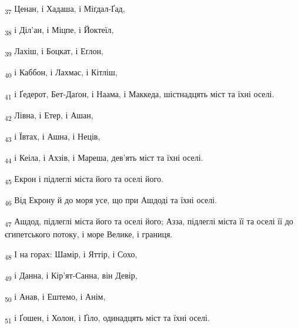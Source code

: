 \begin{tcolorbox}
\textsubscript{37} Ценан, і Хадаша, і Міґдал-Ґад,
\end{tcolorbox}
\begin{tcolorbox}
\textsubscript{38} і Діл'ан, і Міцпе, і Йоктеїл,
\end{tcolorbox}
\begin{tcolorbox}
\textsubscript{39} Лахіш, і Боцкат, і Еґлон,
\end{tcolorbox}
\begin{tcolorbox}
\textsubscript{40} і Каббон, і Лахмас, і Кітліш,
\end{tcolorbox}
\begin{tcolorbox}
\textsubscript{41} і Ґедерот, Бет-Даґон, і Наама, і Маккеда, шістнадцять міст та їхні оселі.
\end{tcolorbox}
\begin{tcolorbox}
\textsubscript{42} Лівна, і Етер, і Ашан,
\end{tcolorbox}
\begin{tcolorbox}
\textsubscript{43} і Ївтах, і Ашна, і Неців,
\end{tcolorbox}
\begin{tcolorbox}
\textsubscript{44} і Кеіла, і Ахзів, і Мареша, дев'ять міст та їхні оселі.
\end{tcolorbox}
\begin{tcolorbox}
\textsubscript{45} Екрон і підлеглі міста його та оселі його.
\end{tcolorbox}
\begin{tcolorbox}
\textsubscript{46} Від Екрону й до моря усе, що при Ашдоді та їхні оселі.
\end{tcolorbox}
\begin{tcolorbox}
\textsubscript{47} Ашдод, підлеглі міста його та оселі його; Азза, підлеглі міста її та оселі її до єгипетського потоку, і море Велике, і границя.
\end{tcolorbox}
\begin{tcolorbox}
\textsubscript{48} І на горах: Шамір, і Яттір, і Сохо,
\end{tcolorbox}
\begin{tcolorbox}
\textsubscript{49} і Данна, і Кір'ят-Санна, він Девір,
\end{tcolorbox}
\begin{tcolorbox}
\textsubscript{50} і Анав, і Ештемо, і Анім,
\end{tcolorbox}
\begin{tcolorbox}
\textsubscript{51} і Ґошен, і Холон, і Ґіло, одинадцять міст та їхні оселі.
\end{tcolorbox}
